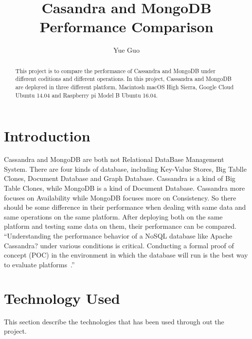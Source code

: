 
\title{Casandra and MongoDB Performance Comparison}

\author{Yue Guo}

\begin{abstract}
This project is to compare the performance of Cassandra and MongoDB 
under different coditions and different operations. In this project, Cassandra
 and MongoDB are deployed in three different platform, Macintosh macOS 
 High Sierra, Google Cloud Ubuntu 14.04 and Raspberry pi Model B Ubuntu 
 16.04.
\end{abstract}



\maketitle


\section{Introduction}
Cassandra and MongoDB are both not Relational DataBase Management System. 
There are four kinds of database, including Key-Value Stores, Big Tablle 
Clones, Document Database and Graph Database. Cassandra is a kind of Big 
Table Clones, while MongoDB is a kind of Document Database. Cassandra more 
focuses on Availability while MongoDB focuses more on Consistency. So there
 should be some difference in their performance when dealing with same data 
 and same operations on the same platform. After deploying both on the same 
 platform and testing same data on them, their performance can be compared. 
 ``Understanding the performance behavior of a NoSQL database like Apache 
 Cassandra? under various conditions is critical. Conducting a formal proof 
 of concept (POC) in the environment in which the database will run is the 
 best way to evaluate platforms~\cite{hid-sp18-508-benchmarking}.''

\section{Technology Used}
This section describe the technologies that has been used through out 
the project.

